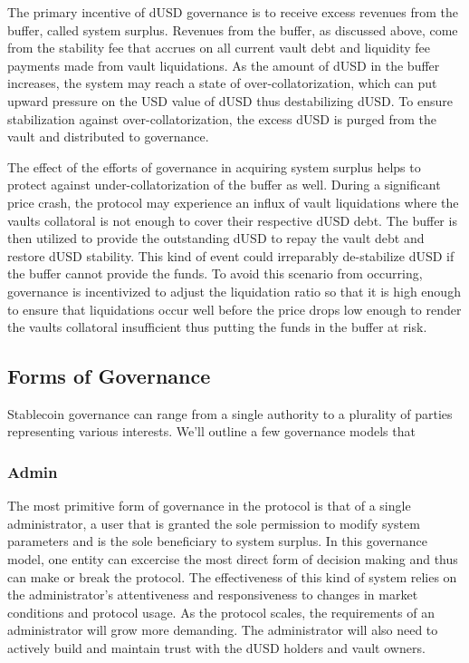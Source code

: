 \documentclass[12pt]{article}
\begin{document}
The primary incentive of dUSD governance is to receive excess revenues from the buffer, called system surplus. Revenues from the buffer, as discussed above, come from the stability fee that accrues on all current vault debt and liquidity fee payments made from vault liquidations. As the amount of dUSD in the buffer increases, the system may reach a state of over-collatorization, which can put upward pressure on the USD value of dUSD thus destabilizing dUSD. To ensure stabilization against over-collatorization, the excess dUSD is purged from the vault and distributed to governance.

The effect of the efforts of governance in acquiring system surplus helps to protect against under-collatorization of the buffer as well. During a significant price crash, the protocol may experience an influx of vault liquidations where the vaults collatoral is not enough to cover their respective dUSD debt. The buffer is then utilized to provide the outstanding dUSD to repay the vault debt and restore dUSD stability. This kind of event could irreparably de-stabilize dUSD if the buffer cannot provide the funds. To avoid this scenario from occurring, governance is incentivized to adjust the liquidation ratio so that it is high enough to ensure that liquidations occur well before the price drops low enough to render the vaults collatoral insufficient thus putting the funds in the buffer at risk.

\subsection{Forms of Governance}

Stablecoin governance can range from a single authority to a plurality of parties representing various interests. We'll outline a few governance models that

\subsubsection{Admin}
The most primitive form of governance in the protocol is that of a single administrator, a user that is granted the sole permission to modify system parameters and is the sole beneficiary to system surplus. In this governance model, one entity can excercise the most direct form of decision making and thus can make or break the protocol. The effectiveness of this kind of system relies on the administrator's attentiveness and responsiveness to changes in market conditions and protocol usage. As the protocol scales, the requirements of an administrator will grow more demanding. The administrator will also need to actively build and maintain trust with the dUSD holders and vault owners.
\end{document}
